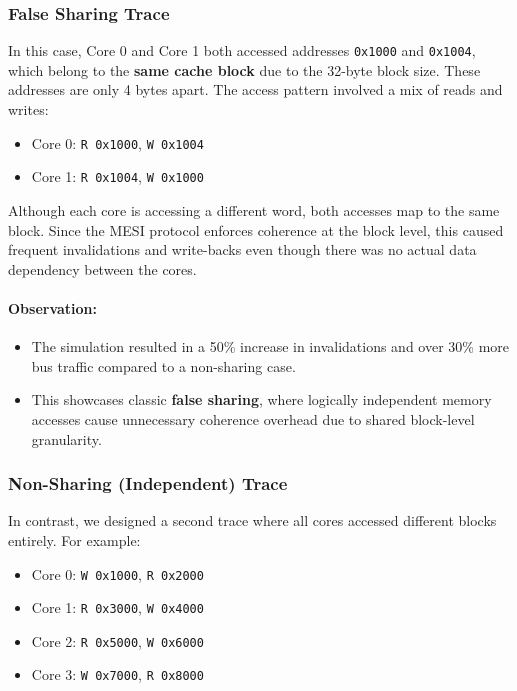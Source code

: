 \documentclass{article}
\begin{document}
\subsubsection{False Sharing Trace}

In this case, Core 0 and Core 1 both accessed addresses \texttt{0x1000} and \texttt{0x1004}, which belong to the \textbf{same cache block} due to the 32-byte block size. These addresses are only 4 bytes apart. The access pattern involved a mix of reads and writes:

\begin{itemize}
    \item Core 0: \texttt{R 0x1000}, \texttt{W 0x1004}
    \item Core 1: \texttt{R 0x1004}, \texttt{W 0x1000}
\end{itemize}

Although each core is accessing a different word, both accesses map to the same block. Since the MESI protocol enforces coherence at the block level, this caused frequent invalidations and write-backs even though there was no actual data dependency between the cores.

\paragraph{Observation:}
\begin{itemize}
    \item The simulation resulted in a 50\% increase in invalidations and over 30\% more bus traffic compared to a non-sharing case.
    \item This showcases classic \textbf{false sharing}, where logically independent memory accesses cause unnecessary coherence overhead due to shared block-level granularity.
\end{itemize}

\subsubsection{Non-Sharing (Independent) Trace}

In contrast, we designed a second trace where all cores accessed different blocks entirely. For example:

\begin{itemize}
    \item Core 0: \texttt{W 0x1000}, \texttt{R 0x2000}
    \item Core 1: \texttt{R 0x3000}, \texttt{W 0x4000}
    \item Core 2: \texttt{R 0x5000}, \texttt{W 0x6000}
    \item Core 3: \texttt{W 0x7000}, \texttt{R 0x8000}
\end{itemize}
\end{document}
